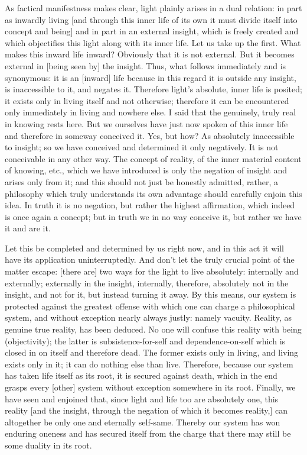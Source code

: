 As factical manifestness makes clear,
light plainly arises in a dual relation:
in part as inwardly living
[and through this inner life of its own it must
divide itself into concept and being]
and in part in an external insight,
which is freely created
and which objectifies this light
along with its inner life.
Let us take up the first.
What makes this inward life inward?
Obviously that it is not external.
But it becomes external in [being seen by] the insight.
Thus, what follows immediately and is synonymous:
it is an [inward] life because in this regard it is
outside any insight, is inaccessible to it, and negates it.
Therefore light’s absolute, inner life is posited;
it exists only in living itself and not otherwise;
therefore it can be encountered only immediately
in living and nowhere else.
I said that the genuinely, truly real in knowing rests here.
But we ourselves have just now spoken of this inner life
and therefore in someway conceived it.
Yes, but how? As absolutely inaccessible to insight;
so we have conceived and determined it only negatively.
It is not conceivable in any other way.
The concept of reality, of the inner material content of knowing, etc.,
which we have introduced is only the negation of insight
and arises only from it;
and this should not just be honestly admitted,
rather, a philosophy which truly understands its own advantage
should carefully enjoin this idea.
In truth it is no negation,
but rather the highest affirmation,
which indeed is once again a concept;
but in truth we in no way conceive it,
but rather we have it and are it.

Let this be completed and determined by us right now,
and in this act it will have its application uninterruptedly.
And don’t let the truly crucial
point of the matter escape:
[there are] two ways
for the light to live absolutely:
internally and externally;
externally in the insight,
internally, therefore, absolutely not in the insight,
and not for it, but instead turning it away.
By this means, our system is protected against
the greatest offense with which
one can charge a philosophical system,
and without exception nearly always justly:
namely vacuity.
Reality, as genuine true reality, has been deduced.
No one will confuse this reality with being (objectivity);
the latter is subsistence-for-self and dependence-on-self
which is closed in on itself and therefore dead.
The former exists only in living,
and living exists only in it;
it can do nothing else than live.
Therefore, because our system has taken life
itself as its root,
it is secured against death,
which in the end grasps every [other]
system without exception somewhere in its root.
Finally, we have seen and enjoined that,
since light and life too are absolutely one,
this reality
[and the insight,
through the negation of which
it becomes reality,]
can altogether be only one
and eternally self-same.
Thereby our system has won enduring oneness
and has secured itself from the charge that
there may still be some duality in its root.

